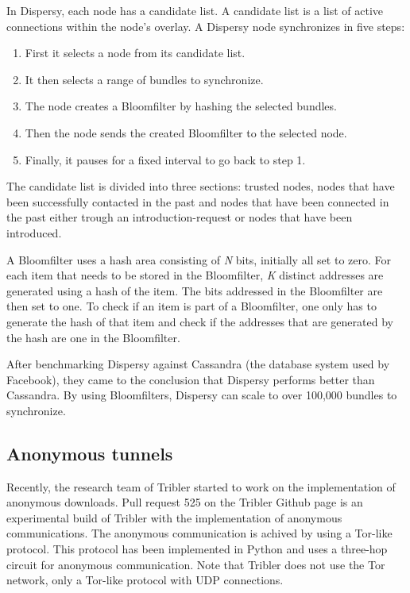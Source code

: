 		In Dispersy, each node has a candidate list. A candidate list is a list of active connections within the node's overlay. A Dispersy node synchronizes in five steps:
		
		\begin{enumerate}
			\item First it selects a node from its candidate list.
			\item It then selects a range of bundles to synchronize.
			\item The node creates a Bloomfilter by hashing the selected bundles.
			\item Then the node sends the created Bloomfilter to the selected node.
			\item Finally, it pauses for a fixed interval to go back to step 1.
		\end{enumerate}
		
		The candidate list is divided into three sections: trusted nodes, nodes that have been successfully contacted in the past and nodes that have been connected in the past either trough an introduction-request or nodes that have been introduced.
		
		A Bloomfilter uses a hash area consisting of \emph{N} bits, initially all set to zero. For each item that needs to be stored in the Bloomfilter, \emph{K} distinct addresses are generated using a hash of the item. The bits addressed in the Bloomfilter are then set to one. To check if an item is part of a Bloomfilter, one only has to generate the hash of that item and check if the addresses that are generated by the hash are one in the Bloomfilter.
		
		After benchmarking Dispersy against Cassandra (the database system used by Facebook), they came to the conclusion that Dispersy performs better than Cassandra. By using Bloomfilters, Dispersy can scale to over 100,000 bundles to synchronize.
		
	\subsection{Anonymous tunnels}
	\label{sec:anonymoustunnels}
		Recently, the research team of Tribler started to work on the implementation of anonymous downloads. Pull request 525 on the Tribler Github page \cite{pullrequest525} is an experimental build of Tribler with the implementation of anonymous communications. The anonymous communication is achived by using a Tor-like protocol. This protocol has been implemented in Python and uses a three-hop circuit for anonymous communication. Note that Tribler does not use the Tor network, only a Tor-like protocol with UDP connections.
		
